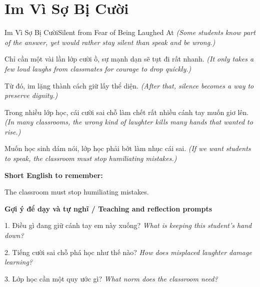\section{Im Vì Sợ Bị Cười}
\begin{truyen}{Im Vì Sợ Bị Cười}{Silent from Fear of Being Laughed At}
\textit{(Some students know part of the answer, yet would rather stay silent than speak and be wrong.)}

Chỉ cần một vài lần lớp cười ồ, sự mạnh dạn sẽ tụt đi rất nhanh.
\textit{(It only takes a few loud laughs from classmates for courage to drop quickly.)}

Từ đó, im lặng thành cách giữ lấy thể diện.
\textit{(After that, silence becomes a way to preserve dignity.)}

Trong nhiều lớp học, cái cười sai chỗ làm chết rất nhiều cánh tay muốn giơ lên.
\textit{(In many classrooms, the wrong kind of laughter kills many hands that wanted to rise.)}

\end{truyen}

\begin{baihoc}
Muốn học sinh dám nói, lớp học phải bớt làm nhục cái sai.
\textit{(If we want students to speak, the classroom must stop humiliating mistakes.)}
\end{baihoc}

\begin{ghinhoanh}
\textbf{Short English to remember:}

The classroom must stop humiliating mistakes.

\end{ghinhoanh}

\begin{tuhocnhanh}
\textbf{Gợi ý để dạy và tự nghĩ / Teaching and reflection prompts}

1. Điều gì đang giữ cánh tay em này xuống? \textit{What is keeping this student’s hand down?}

2. Tiếng cười sai chỗ phá học như thế nào? \textit{How does misplaced laughter damage learning?}

3. Lớp học cần một quy ước gì? \textit{What norm does the classroom need?}
\end{tuhocnhanh}
\ngancach

